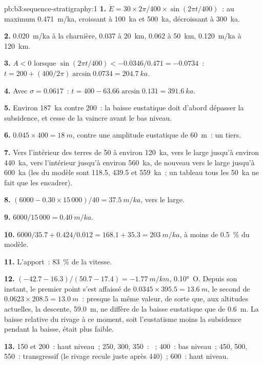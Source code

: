 \begin{solution}{pb:b3:sequence-stratigraphy:1}
\textbf{1.} $\dot E = 30\times2\pi/400\times\sin(2\pi t/400)$~: au maximum
\qty{0.471}{m/ka}, croissant à \qty{100}{ka} et \qty{500}{ka}, décroissant à
\qty{300}{ka}.

\textbf{2.} \qty{0.020}{m/ka} à la charnière, 0.037 à \qty{20}{km}, 0.062 à
\qty{50}{km}, \qty{0.120}{m/ka} à \qty{120}{km}.

\textbf{3.} $A < 0$ lorsque $\sin(2\pi t/400) < -0.0346/0.471 = -0.0734$~: $t =
200 + (400/2\pi)\arcsin0.0734 = \qty{204.7}{ka}$.

\textbf{4.} Avec $\sigma = 0.0617$~: $t = 400 - 63.66\arcsin0.131 =
\qty{391.6}{ka}$.

\textbf{5.} Environ \qty{187}{ka} contre 200~: la baisse eustatique doit
d'abord dépasser la subsidence, et cesse de la vaincre avant le bas niveau.

\textbf{6.} $0.045\times400 = \qty{18}{m}$, contre une amplitude eustatique de
\qty{60}{m}~: un tiers.

\textbf{7.} Vers l'intérieur des terres de 50 à environ \qty{120}{ka}, vers le large jusqu'à environ
\qty{440}{ka}, vers l'intérieur jusqu'à environ \qty{560}{ka}, de nouveau vers le large jusqu'à
\qty{600}{ka} (les  du modèle sont 118.5, 439.5 et
\qty{559}{ka}~; un tableau tous les \qty{50}{ka} ne fait que les encadrer).

\textbf{8.} $(6000 - 0.30\times15\,000)/40 = \qty{37.5}{m/ka}$, vers le large.

\textbf{9.} $6000/15\,000 = \qty{0.40}{m/ka}$.

\textbf{10.} $6000/35.7 + 0.424/0.012 = 168.1 + 35.3 = \qty{203}{m/ka}$,
à moins de \qty{0.5}{\percent} du modèle.

\textbf{11.} L'apport~: \qty{83}{\percent} de la vitesse.

\textbf{12.} $(-42.7 - 16.3)/(50.7 - 17.4) = \qty{-1.77}{m/km}$, \ang{0.10}~O.
Depuis son instant, le premier point s'est affaissé de $0.0345\times395.5 =
\qty{13.6}{m}$, le second de $0.0623\times208.5 = \qty{13.0}{m}$~: presque
la même valeur, de sorte que, aux altitudes actuelles, la descente, \qty{59.0}{m}, ne diffère
de la baisse eustatique que de \qty{0.6}{m}. La baisse relative du rivage à
ce moment, soit l'eustatisme moins la subsidence pendant la baisse, était plus faible.

\textbf{13.} 150 et 200~: haut niveau~; 250, 300, 350~: ~; 400~:
bas niveau~; 450, 500, 550~: transgressif (le rivage recule juste après
440)~; 600~: haut niveau.


\end{solution}
